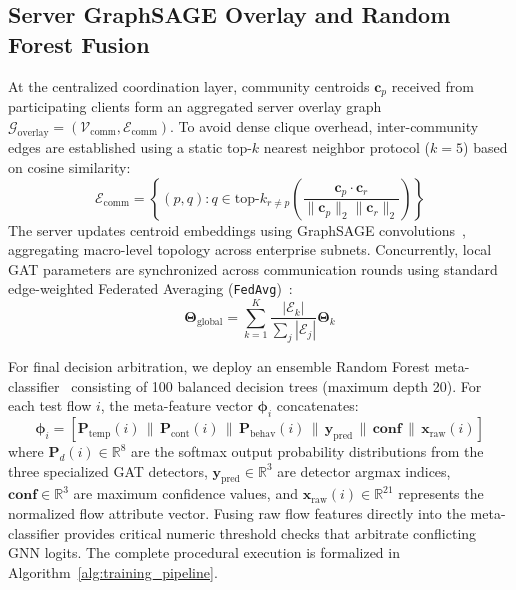 \documentclass[journal,onecolumn]{IEEEtran}
\begin{document}
\subsection{Server GraphSAGE Overlay and Random Forest Fusion}
At the centralized coordination layer, community centroids $\boldsymbol{c}_p$ received from participating clients form an aggregated server overlay graph $\mathcal{G}_{\text{overlay}} = (\mathcal{V}_{\text{comm}}, \mathcal{E}_{\text{comm}})$. To avoid dense clique overhead, inter-community edges are established using a static top-$k$ nearest neighbor protocol ($k = 5$) based on cosine similarity:
\begin{equation}
\mathcal{E}_{\text{comm}} = \left\{ (p, q) : q \in \text{top-}k_{r \neq p}\left( \frac{\boldsymbol{c}_p \cdot \boldsymbol{c}_r}{\|\boldsymbol{c}_p\|_2 \|\boldsymbol{c}_r\|_2} \right) \right\}
\label{eq:topk_overlay}
\end{equation}
The server updates centroid embeddings using GraphSAGE convolutions~\cite{hamilton2017graphsage}, aggregating macro-level topology across enterprise subnets. Concurrently, local GAT parameters are synchronized across communication rounds using standard edge-weighted Federated Averaging (\texttt{FedAvg})~\cite{mcmahan2017federated}:
\begin{equation}
\boldsymbol{\Theta}_{\text{global}} = \sum_{k=1}^K \frac{|\mathcal{E}_k|}{\sum_{j} |\mathcal{E}_j|} \boldsymbol{\Theta}_k
\label{eq:fedavg_agg}
\end{equation}

For final decision arbitration, we deploy an ensemble Random Forest meta-classifier~\cite{breiman2001randomforests} consisting of 100 balanced decision trees (maximum depth 20). For each test flow $i$, the meta-feature vector $\boldsymbol{\phi}_i$ concatenates:
\begin{equation}
\boldsymbol{\phi}_i = \left[ \boldsymbol{P}_{\text{temp}}(i) \,\|\, \boldsymbol{P}_{\text{cont}}(i) \,\|\, \boldsymbol{P}_{\text{behav}}(i) \,\|\, \boldsymbol{y}_{\text{pred}} \,\|\, \boldsymbol{conf} \,\|\, \boldsymbol{x}_{\text{raw}}(i) \right]
\label{eq:meta_features}
\end{equation}
where $\boldsymbol{P}_d(i) \in \mathbb{R}^8$ are the softmax output probability distributions from the three specialized GAT detectors, $\boldsymbol{y}_{\text{pred}} \in \mathbb{R}^3$ are detector argmax indices, $\boldsymbol{conf} \in \mathbb{R}^3$ are maximum confidence values, and $\boldsymbol{x}_{\text{raw}}(i) \in \mathbb{R}^{21}$ represents the normalized flow attribute vector. Fusing raw flow features directly into the meta-classifier provides critical numeric threshold checks that arbitrate conflicting GNN logits. The complete procedural execution is formalized in Algorithm~\ref{alg:training_pipeline}.
\end{document}
